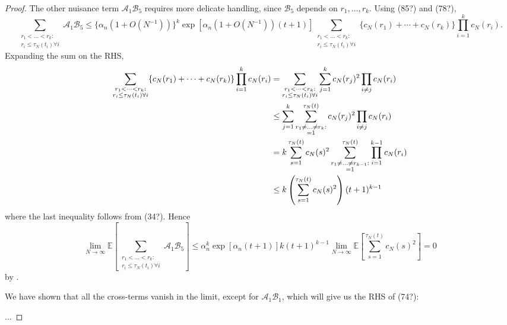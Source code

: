 \documentclass{article}
\newcommand{\E}{\mathbb{E}}
\newcommand{\1}[1]{\mathbbm{1}_{#1}}
\begin{document}
\begin{proof}
The other nuisance term $\mathscr{A}_1 \mathscr{B}_5$ requires more delicate handling, since $\mathscr{B}_5$ depends on $r_1, \dots, r_k$. Using (85?) and (78?),
\begin{equation}
\sum_{\substack{r_1 <\dots< r_k :\\ r_i \leq \tau_N(t_i) \forall i}} \mathscr{A}_1 \mathscr{B}_5
\leq \{ \alpha_n (1+O(N^{-1})) \}^k \exp[ \alpha_n (1 + O(N^{-1})) (t+1) ] 
\sum_{\substack{r_1 <\dots< r_k :\\ r_i \leq \tau_N(t_i) \forall i}}
\{ c_N(r_1) + \cdots + c_N(r_k) \}
\prod_{i=1}^k  c_N(r_i) .
\end{equation}
Expanding the sum on the RHS,
\begin{align}
\sum_{\substack{r_1 <\dots< r_k :\\ r_i \leq \tau_N(t_i) \forall i}}
\{ c_N(r_1) + \cdots + c_N(r_k) \}
\prod_{i=1}^k  c_N(r_i)
&= \sum_{\substack{r_1 <\dots< r_k :\\ r_i \leq \tau_N(t_i) \forall i}}
\sum_{j=1}^k c_N(r_j)^2 \prod_{i\neq j} c_N(r_i) \notag\\
&\leq \sum_{j=1}^k \sum_{\substack{r_1 \neq \dots \neq r_k :\\ =1}}^{\tau_N(t)} c_N(r_j)^2 \prod_{i\neq j} c_N(r_i) \notag\\
&= k \sum_{s=1}^{\tau_N(t)} c_N(s)^2
\sum_{\substack{r_1 \neq \dots \neq r_{k-1} :\\ =1}}^{\tau_N(t)} \prod_{i=1}^{k-1} c_N(r_i) \notag\\
&\leq k \left( \sum_{s=1}^{\tau_N(t)} c_N(s)^2 \right) (t+1)^{k-1}
\end{align}
where the last inequality follows from (34?).
Hence
\begin{equation}
\lim_{N\to\infty}\E\left[ \sum_{\substack{r_1 <\dots< r_k :\\ r_i \leq \tau_N(t_i) \forall i}} \mathscr{A}_1 \mathscr{B}_5 \right]
\leq \alpha_n^k \exp[ \alpha_n (t+1) ] 
k (t+1)^{k-1} \lim_{N\to\infty}\E\left[ \sum_{s=1}^{\tau_N(t)} c_N(s)^2 \right] =0
\end{equation}
by \citet[Equation (4)]{brown2020}.

We have shown that all the cross-terms vanish in the limit, except for $\mathscr{A}_1 \mathscr{B}_1$, which will give us the RHS of (74?):

...



\end{proof}







\end{document}
